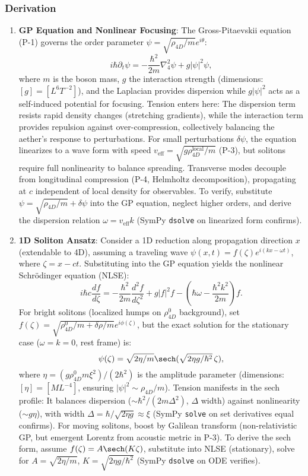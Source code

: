\subsubsection{Derivation}
\begin{enumerate}
\item \textbf{GP Equation and Nonlinear Focusing}: The Gross-Pitaevskii equation (P-1) governs the order parameter $\psi = \sqrt{\rho_{4D}/m} e^{i \theta}$:
   \[
   i \hbar \partial_t \psi = -\frac{\hbar^2}{2 m} \nabla_4^2 \psi + g |\psi|^2 \psi,
   \]
   where $m$ is the boson mass, $g$ the interaction strength (dimensions: $[g] = [L^6 T^{-2}]$), and the Laplacian provides dispersion while $g |\psi|^2$ acts as a self-induced potential for focusing. Tension enters here: The dispersion term resists rapid density changes (stretching gradients), while the interaction term provides repulsion against over-compression, collectively balancing the aether's response to perturbations. For small perturbations $\delta \psi$, the equation linearizes to a wave form with speed $v_{\text{eff}} = \sqrt{g \rho_{4D}^{\text{local}} / m}$ (P-3), but solitons require full nonlinearity to balance spreading. Transverse modes decouple from longitudinal compression (P-4, Helmholtz decomposition), propagating at $c$ independent of local density for observables. To verify, substitute $\psi = \sqrt{\rho_{4D}/m} + \delta \psi$ into the GP equation, neglect higher orders, and derive the dispersion relation $\omega = v_{\text{eff}} k$ (SymPy \texttt{dsolve} on linearized form confirms).

\item \textbf{1D Soliton Ansatz}: Consider a 1D reduction along propagation direction $x$ (extendable to 4D), assuming a traveling wave $\psi(x,t) = f(\zeta) e^{i (k x - \omega t)}$, where $\zeta = x - c t$. Substituting into the GP equation yields the nonlinear Schrödinger equation (NLSE):
   \[
   i \hbar c \frac{df}{d\zeta} = -\frac{\hbar^2}{2 m} \frac{d^2 f}{d\zeta^2} + g |f|^2 f - (\hbar \omega - \frac{\hbar^2 k^2}{2 m}) f.
   \]
   For bright solitons (localized humps on $\rho_{4D}^0$ background), set $f(\zeta) = \sqrt{\rho_{4D}^0 / m + \delta \rho / m} e^{i \phi(\zeta)}$, but the exact solution for the stationary case ($\omega = k = 0$, rest frame) is:
   \[
   \psi(\zeta) = \sqrt{2 \eta / m} \sech(\sqrt{2 \eta g / \hbar^2} \, \zeta),
   \]
   where $\eta = (g \rho_{4D}^0 m \xi^2) / (2 \hbar^2)$ is the amplitude parameter (dimensions: $[\eta] = [M L^{-4}]$, ensuring $|\psi|^2 \sim \rho_{4D}/m$). Tension manifests in the sech profile: It balances dispersion ($\sim \hbar^2 / (2 m \Delta^2)$, $\Delta$ width) against nonlinearity ($\sim g \eta$), with width $\Delta = \hbar / \sqrt{2 \eta g} \approx \xi$ (SymPy \texttt{solve} on set derivatives equal confirms). For moving solitons, boost by Galilean transform (non-relativistic GP, but emergent Lorentz from acoustic metric in P-3). To derive the sech form, assume $f(\zeta) = A \sech(K \zeta)$, substitute into NLSE (stationary), solve for $A = \sqrt{2 \eta / m}$, $K = \sqrt{2 \eta g / \hbar^2}$ (SymPy \texttt{dsolve} on ODE verifies).


\end{enumerate}
